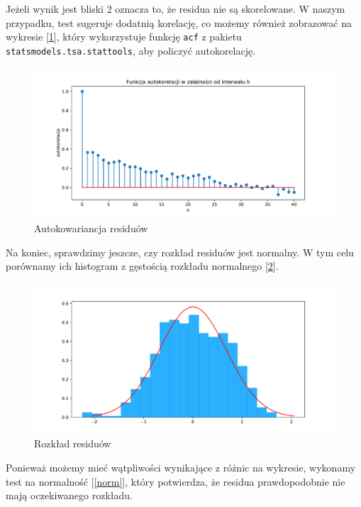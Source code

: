 \documentclass{article}
\theoremstyle{break}
\newcommand{\code}[1]{\colorbox{light-gray}{\texttt{#1}}}
\begin{document}
Jeżeli wynik jest bliski 2 oznacza to, że residua nie są skorelowane. W naszym przypadku, test sugeruje dodatnią korelację, co możemy również zobrazować na wykresie [\ref{fig:acor}], który wykorzystuje funkcję \code{acf} z pakietu \code{statsmodels.tsa.stattools}, aby policzyć autokorelację.

\begin{figure}[H]
	\begin{center}
		\includegraphics[scale=0.5]{acor.pdf}
		\caption{Autokowariancja residuów}
		\label{fig:acor}
	\end{center}
\end{figure}

Na koniec, sprawdzimy jeszcze, czy rozkład residuów jest normalny. W tym celu porównamy ich histogram z gęstością rozkładu normalnego [\ref{fig:res_hist}]. 
\begin{figure}[H]
	\begin{center}
		\includegraphics[scale=0.5]{res_hist.pdf}
		\caption{Rozkład residuów}
		\label{fig:res_hist}
	\end{center}
\end{figure}

 Ponieważ możemy mieć wątpliwości wynikające z różnic na wykresie, wykonamy test na normalność [\ref{norm}], który potwierdza, że residua prawdopodobnie nie mają oczekiwanego rozkładu.
\end{document}
